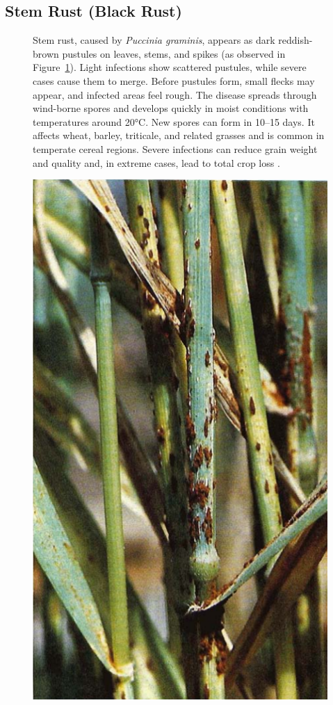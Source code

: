 \subsection{Stem Rust (Black Rust)}

\begin{figure}[H]
    \centering
    \begin{minipage}{0.65\textwidth}
        \small
        Stem rust, caused by \textit{Puccinia graminis}, appears as dark reddish-brown pustules on leaves, stems, and spikes (as observed in Figure~\ref{fig:Figure04}). Light infections show scattered pustules, while severe cases cause them to merge. Before pustules form, small flecks may appear, and infected areas feel rough. The disease spreads through wind-borne spores and develops quickly in moist conditions with temperatures around 20°C. New spores can form in 10–15 days. It affects wheat, barley, triticale, and related grasses and is common in temperate cereal regions. Severe infections can reduce grain weight and quality and, in extreme cases, lead to total crop loss \parencite{duveiller2012wheat}.
    \end{minipage}%
    \hfill
    \begin{minipage}{0.3\textwidth}
        \centering
        \includegraphics[width=0.6\linewidth]{chapters/chapter2/images/Figure04.png}
        \label{fig:Figure04}
    \end{minipage}
\end{figure}



